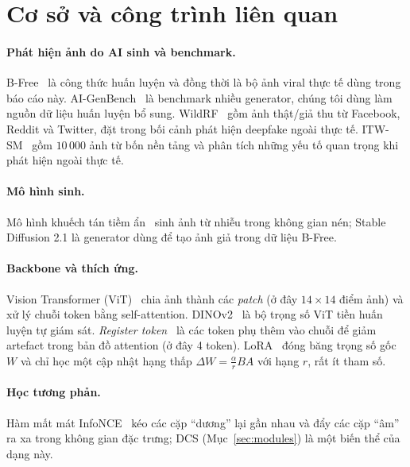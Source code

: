 \documentclass[11pt,a4paper]{article}
\begin{document}
\section{Cơ sở và công trình liên quan}\label{sec:related}

\paragraph{Phát hiện ảnh do AI sinh và benchmark.} B-Free~\cite{guillaro2025bfree} là công thức huấn luyện và đồng thời là bộ ảnh viral thực tế dùng trong báo cáo này. AI-GenBench~\cite{pellegrini2025aigenbench,aigenbench2025software} là benchmark nhiều generator, chúng tôi dùng làm nguồn dữ liệu huấn luyện bổ sung. WildRF~\cite{cavia2024realtime} gồm ảnh thật/giả thu từ Facebook, Reddit và Twitter, đặt trong bối cảnh phát hiện deepfake ngoài thực tế. ITW-SM~\cite{konstantinidou2026navigating} gồm $10\,000$ ảnh từ bốn nền tảng và phân tích những yếu tố quan trọng khi phát hiện ngoài thực tế.

\paragraph{Mô hình sinh.} Mô hình khuếch tán tiềm ẩn~\cite{rombach2022highresolution} sinh ảnh từ nhiễu trong không gian nén; Stable Diffusion 2.1 là generator dùng để tạo ảnh giả trong dữ liệu B-Free.

\paragraph{Backbone và thích ứng.} Vision Transformer (ViT)~\cite{dosovitskiy2021image} chia ảnh thành các \emph{patch} (ở đây $14\times14$ điểm ảnh) và xử lý chuỗi token bằng self-attention. DINOv2~\cite{oquab2023dinov2} là bộ trọng số ViT tiền huấn luyện tự giám sát. \emph{Register token}~\cite{darcet2024vision} là các token phụ thêm vào chuỗi để giảm artefact trong bản đồ attention (ở đây 4 token). LoRA~\cite{hu2022lora} đóng băng trọng số gốc $W$ và chỉ học một cập nhật hạng thấp $\Delta W=\tfrac{\alpha}{r}BA$ với hạng $r$, rất ít tham số.

\paragraph{Học tương phản.} Hàm mất mát InfoNCE~\cite{oord2018representation} kéo các cặp ``dương'' lại gần nhau và đẩy các cặp ``âm'' ra xa trong không gian đặc trưng; DCS (Mục~\ref{sec:modules}) là một biến thể của dạng này.
\end{document}
